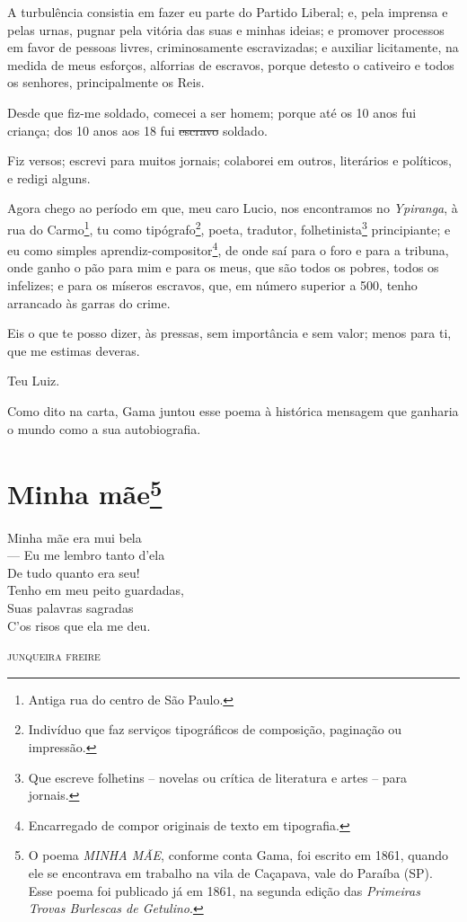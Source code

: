 A turbulência consistia em fazer eu parte do Partido Liberal; e, pela
imprensa e pelas urnas, pugnar pela vitória das suas e minhas ideias; e
promover processos em favor de pessoas livres, criminosamente
escravizadas; e auxiliar licitamente, na medida de meus esforços,
alforrias de escravos, porque detesto o cativeiro e todos os senhores,
principalmente os Reis.

Desde que fiz-me soldado, comecei a ser homem; porque até os 10 anos fui
criança; dos 10 anos aos 18 fui \sout{escravo} soldado.

Fiz versos; escrevi para muitos jornais; colaborei em outros, literários
e políticos, e redigi alguns.

Agora chego ao período em que, meu caro Lucio, nos encontramos no
\emph{Ypiranga}, à rua do Carmo\footnote{Antiga rua do centro de São
  Paulo.}, tu como tipógrafo\footnote{Indivíduo que faz serviços
  tipográficos de composição, paginação ou impressão.}, poeta, tradutor,
folhetinista\footnote{Que escreve folhetins -- novelas ou crítica de
  literatura e artes -- para jornais.} principiante; e eu como simples
aprendiz-compositor\footnote{Encarregado de compor originais de texto
  em tipografia.}, de onde
saí para o foro e para a tribuna, onde ganho o pão para mim e para os
meus, que são todos os pobres, todos os infelizes; e para os míseros
escravos, que, em número superior a 500, tenho arrancado às garras do
crime.

Eis o que te posso dizer, às pressas, sem importância e sem valor; menos
para ti, que me estimas deveras.

Teu Luiz.

\pagebreak
\mbox{}\vfill
\thispagestyle{empty}

{\small\noindent
Como dito na carta, Gama juntou esse poema à histórica mensagem
que ganharia o mundo como a sua autobiografia. }

\chapter{Minha mãe\footnote[*]{O poema \emph{MINHA MÃE}, conforme
  conta Gama, foi escrito em 1861, quando ele se encontrava em trabalho
  na vila de Caçapava, vale do Paraíba (SP). Esse poema foi publicado já
  em 1861, na segunda edição das \emph{Primeiras Trovas Burlescas de
  Getulino}.}}


\epigraph{Minha mãe era mui bela\\
--- Eu me lembro tanto d'ela\\
De tudo quanto era seu!\\
Tenho em meu peito guardadas,\\
Suas palavras sagradas\\
C'os risos que ela me deu.}{\textsc{junqueira freire}\footnotemark}

